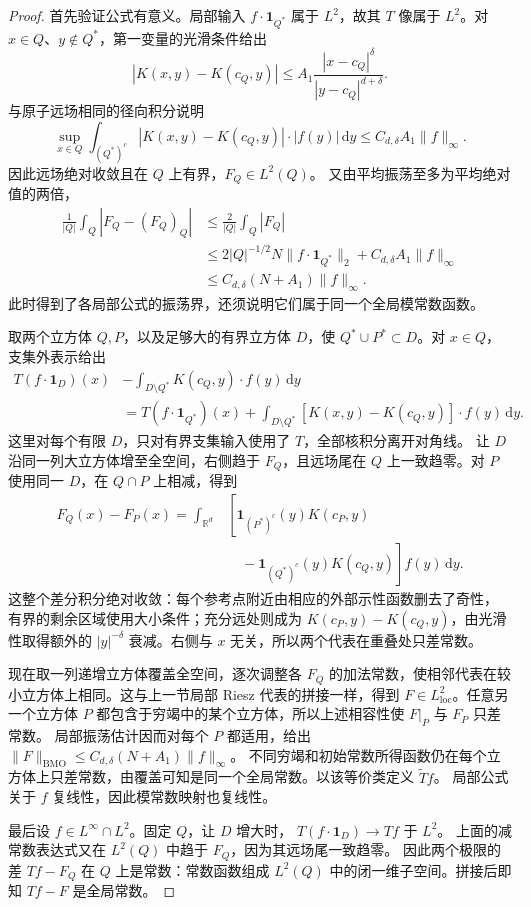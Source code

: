 \begin{proof}
首先验证公式有意义。局部输入 \(f\cdot\mathbf1_{Q^*}\) 属于 \(L^2\)，故其
\(T\) 像属于 \(L^2\)。对 \(x\in Q\)、\(y\notin Q^*\)，第一变量的光滑条件给出
\[
 |K(x,y)-K(c_Q,y)|
 \le A_1\frac{|x-c_Q|^\delta}{|y-c_Q|^{d+\delta}}.
\]
与原子远场相同的径向积分说明
\[
 \sup_{x\in Q}
 \int_{(Q^*)^c}|K(x,y)-K(c_Q,y)|\cdot|f(y)|\,\mathrm dy
 \le C_{d,\delta}A_1\|f\|_\infty.
\]
因此远场绝对收敛且在 \(Q\) 上有界，\(F_Q\in L^2(Q)\)。
又由平均振荡至多为平均绝对值的两倍，
\[
\begin{aligned}
 \frac1{|Q|}\int_Q|F_Q-(F_Q)_Q|
 &\le\frac2{|Q|}\int_Q|F_Q|\\
 &\le2|Q|^{-1/2}N\|f\cdot\mathbf1_{Q^*}\|_2
        +C_{d,\delta}A_1\|f\|_\infty\\
 &\le C_{d,\delta}(N+A_1)\|f\|_\infty.
\end{aligned}
\]
此时得到了各局部公式的振荡界，还须说明它们属于同一个全局模常数函数。

取两个立方体 \(Q,P\)，以及足够大的有界立方体 \(D\)，使
\(Q^*\cup P^*\subset D\)。对 \(x\in Q\)，支集外表示给出
\[
\begin{aligned}
 T(f\cdot\mathbf1_D)(x)
 &-\int_{D\setminus Q^*}K(c_Q,y)\cdot f(y)\,\mathrm dy\\
 &=T(f\cdot\mathbf1_{Q^*})(x)
   +\int_{D\setminus Q^*}
        [K(x,y)-K(c_Q,y)]\cdot f(y)\,\mathrm dy.
\end{aligned}
\]
这里对每个有限 \(D\)，只对有界支集输入使用了 \(T\)，全部核积分离开对角线。
让 \(D\) 沿同一列大立方体增至全空间，右侧趋于 \(F_Q\)，且远场尾在
\(Q\) 上一致趋零。对 \(P\) 使用同一 \(D\)，在 \(Q\cap P\) 上相减，得到
\[
\begin{aligned}
 F_Q(x)-F_P(x)
 =\int_{\mathbb R^d}
 &\left[\mathbf1_{(P^*)^c}(y)K(c_P,y)\right.\\
 &\left.\quad-\mathbf1_{(Q^*)^c}(y)K(c_Q,y)\right]
 f(y)\,\mathrm dy.
\end{aligned}
\]
这整个差分积分绝对收敛：每个参考点附近由相应的外部示性函数删去了奇性，
有界的剩余区域使用大小条件；充分远处则成为
\(K(c_P,y)-K(c_Q,y)\)，由光滑性取得额外的
\(|y|^{-\delta}\) 衰减。右侧与 \(x\) 无关，所以两个代表在重叠处只差常数。

现在取一列递增立方体覆盖全空间，逐次调整各 \(F_Q\) 的加法常数，使相邻代表在较小立方体上相同。这与上一节局部 Riesz 代表的拼接一样，得到
\(F\in L^2_{\mathrm{loc}}\)。任意另一个立方体 \(P\) 都包含于穷竭中的某个立方体，所以上述相容性使 \(F|_P\) 与 \(F_P\) 只差常数。
局部振荡估计因而对每个 \(P\) 都适用，给出
\(\|F\|_{\mathrm{BMO}}\le C_{d,\delta}(N+A_1)\|f\|_\infty\)。
不同穷竭和初始常数所得函数仍在每个立方体上只差常数，由覆盖可知是同一个全局常数。以该等价类定义 \(\widetilde Tf\)。
局部公式关于 \(f\) 复线性，因此模常数映射也复线性。

最后设 \(f\in L^\infty\cap L^2\)。固定 \(Q\)，让 \(D\) 增大时，
\(T(f\cdot\mathbf1_D)\to Tf\) 于 \(L^2\)。
上面的减常数表达式又在 \(L^2(Q)\) 中趋于 \(F_Q\)，因为其远场尾一致趋零。
因此两个极限的差 \(Tf-F_Q\) 在 \(Q\) 上是常数：常数函数组成
\(L^2(Q)\) 中的闭一维子空间。拼接后即知 \(Tf-F\) 是全局常数。
\end{proof}

